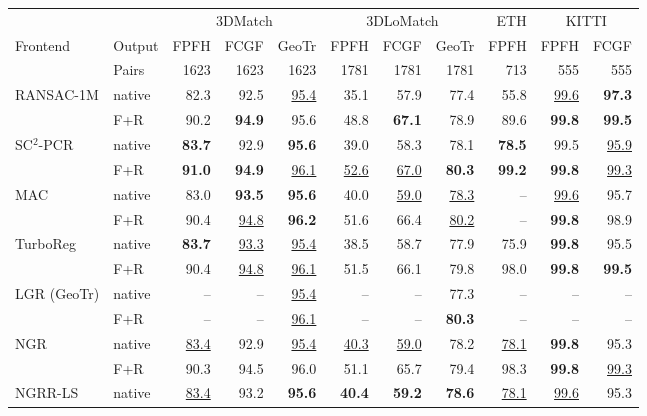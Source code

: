 \begin{tabular}{llrrrrrrrrr}
\toprule
 & & \multicolumn{3}{c}{3DMatch} & \multicolumn{3}{c}{3DLoMatch} & ETH & \multicolumn{2}{c}{KITTI} \\
\cmidrule(lr){3-5}\cmidrule(lr){6-8}\cmidrule(lr){9-9}\cmidrule(lr){10-11}
Frontend & Output & FPFH & FCGF & GeoTr & FPFH & FCGF & GeoTr & FPFH & FPFH & FCGF \\
 & Pairs & 1623 & 1623 & 1623 & 1781 & 1781 & 1781 & 713 & 555 & 555 \\
\midrule
RANSAC-1M & native & 82.3 & 92.5 & \underline{95.4} & 35.1 & 57.9 & 77.4 & 55.8 & \underline{99.6} & \textbf{97.3} \\
 & F+R & 90.2 & \textbf{94.9} & 95.6 & 48.8 & \textbf{67.1} & 78.9 & 89.6 & \textbf{99.8} & \textbf{99.5} \\
\addlinespace[2pt]
SC$^2$-PCR & native & \textbf{83.7} & 92.9 & \textbf{95.6} & 39.0 & 58.3 & 78.1 & \textbf{78.5} & 99.5 & \underline{95.9} \\
 & F+R & \textbf{91.0} & \textbf{94.9} & \underline{96.1} & \underline{52.6} & \underline{67.0} & \textbf{80.3} & \textbf{99.2} & \textbf{99.8} & \underline{99.3} \\
\addlinespace[2pt]
MAC & native & 83.0 & \textbf{93.5} & \textbf{95.6} & 40.0 & \underline{59.0} & \underline{78.3} & -- & \underline{99.6} & 95.7 \\
 & F+R & 90.4 & \underline{94.8} & \textbf{96.2} & 51.6 & 66.4 & \underline{80.2} & -- & \textbf{99.8} & 98.9 \\
\addlinespace[2pt]
TurboReg & native & \textbf{83.7} & \underline{93.3} & \underline{95.4} & 38.5 & 58.7 & 77.9 & 75.9 & \textbf{99.8} & 95.5 \\
 & F+R & 90.4 & \underline{94.8} & \underline{96.1} & 51.5 & 66.1 & 79.8 & 98.0 & \textbf{99.8} & \textbf{99.5} \\
\addlinespace[2pt]
LGR (GeoTr) & native & -- & -- & \underline{95.4} & -- & -- & 77.3 & -- & -- & -- \\
 & F+R & -- & -- & \underline{96.1} & -- & -- & \textbf{80.3} & -- & -- & -- \\
\addlinespace[2pt]
NGR & native & \underline{83.4} & 92.9 & \underline{95.4} & \underline{40.3} & \underline{59.0} & 78.2 & \underline{78.1} & \textbf{99.8} & 95.3 \\
 & F+R & 90.3 & 94.5 & 96.0 & 51.1 & 65.7 & 79.4 & 98.3 & \textbf{99.8} & \underline{99.3} \\
\addlinespace[2pt]
NGRR-LS & native & \underline{83.4} & 93.2 & \textbf{95.6} & \textbf{40.4} & \textbf{59.2} & \textbf{78.6} & \underline{78.1} & \underline{99.6} & 95.3 \\

\end{tabular}
